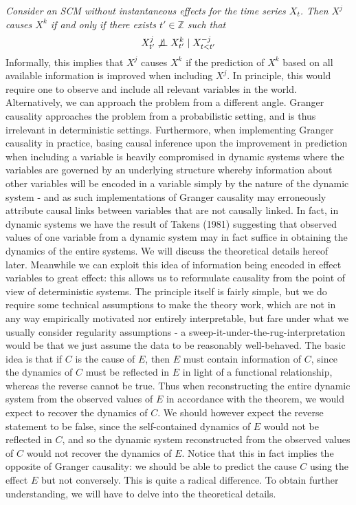 \documentclass[11pt, a4paper]{memoir}
\newcommand{\mZ}{\mathbb{Z}}
\newcommand{\indep}{\perp \!\!\! \perp}
\begin{document}
\textit{Consider an SCM without instantaneous effects for the time series $X_t$. Then $X^j$ causes $X^k$ if and only if there exists $t'\in \mZ$ such that
$$X_{t'}^j\centernot \indep X_{t'}^k\mid X_{t<t'}^{-j}$$}
Informally, this implies that $X^j$ causes $X^k$ if the prediction of $X^k$ based on all available information is improved when including $X^j$. In principle, this would require one to observe and include all relevant variables in the world.\\
Alternatively, we can approach the problem from a different angle. Granger causality approaches the problem from a probabilistic setting, and is thus irrelevant in deterministic settings. Furthermore, when implementing Granger causality in practice, basing causal inference upon the improvement in prediction when including a variable is heavily compromised in dynamic systems where the variables are governed by an underlying structure whereby information about other variables will be encoded in a variable simply by the nature of the dynamic system - and as such implementations of Granger causality may erroneously attribute causal links between variables that are not causally linked. In fact, in dynamic systems we have the result of Takens (1981) suggesting that observed values of one variable from a dynamic system may in fact suffice in obtaining the dynamics of the entire systems. We will discuss the theoretical details hereof later. Meanwhile we can exploit this idea of information being encoded in effect variables to great effect: this allows us to reformulate causality from the point of view of deterministic systems. The principle itself is fairly simple, but we do require some technical assumptions to make the theory work, which are not in any way empirically motivated nor entirely interpretable, but fare under what we usually consider regularity assumptions - a sweep-it-under-the-rug-interpretation would be that we just assume the data to be reasonably well-behaved. The basic idea is that if $C$ is the cause of $E$, then $E$ must contain information of $C$, since the dynamics of $C$ must be reflected in $E$ in light of a functional relationship, whereas the reverse cannot be true. Thus when reconstructing the entire dynamic system from the observed values of $E$ in accordance with the theorem, we would expect to recover the dynamics of $C$. We should however expect the reverse statement to be false, since the self-contained dynamics of $E$ would not be reflected in $C$, and so the dynamic system reconstructed from the observed values of $C$ would not recover the dynamics of $E$. Notice that this in fact implies the opposite of Granger causality: we should be able to predict the cause $C$ using the effect $E$ but not conversely. This is quite a radical difference. To obtain further understanding, we will have to delve into the theoretical details. 
\end{document}
